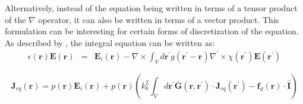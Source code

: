 			Alternatively, instead of the equation being written in terms of a tensor product of the $\nabla$ operator, it can also be written in terms of a vector product. This formulation can be interesting for certain forms of discretization of the equation. As described by \cite{chew2009}, the integral equation can be written as:
			\begin{eqnarray}
				\epsilon(\mathbf{r})\mathbf{E}(\mathbf{r}) &=& \mathbf{E}_i(\mathbf{r}) - \nabla\times\int_Vd\mathbf{r^\prime}g(\mathbf{r^\prime}-\mathbf{r})\nabla^\prime\times\chi(\mathbf{r^\prime})\mathbf{E}(\mathbf{r^\prime}) \label{eq:2:eisp:8}
			\end{eqnarray}
		
			\begin{equation}
				\mathbf{J}_{eq}(\mathbf{r}) = p(\mathbf{r})\mathbf{E}_i(\mathbf{r}) + p(\mathbf{r})\left(  k_b^2\int_Vd\mathbf{r^\prime} \mathbf{\bar{G}}(\mathbf{r},\mathbf{r^\prime})\cdot\mathbf{J}_{eq}(\mathbf{r^\prime}) - \mathbf{f}_d(\mathbf{\mathbf{r}})\cdot\mathbf{\bar{I}} \right) \label{eq:2:eisp:cseb}
			\end{equation} 
		
